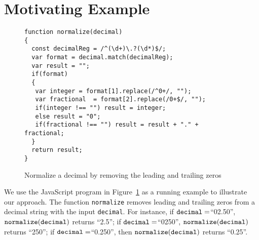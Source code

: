
\section{Motivating Example}\label{sec:mot}

\begin{figure}[htbp]
\begin{center}
\begin{verbatim}
function normalize(decimal)
{
  const decimalReg = /^(\d+)\.?(\d*)$/;
  var format = decimal.match(decimalReg);
  var result = "";
  if(format)
  {
   var integer = format[1].replace(/^0+/, "");
   var fractional  = format[2].replace(/0+$/, "");
   if(integer !== "") result = integer;
   else result = "0"; 
   if(fractional !== "") result = result + "." + fractional;
  }
  return result;
}
\end{verbatim}
\end{center}
\vspace{-8mm}
\caption{Normalize a decimal by removing the leading and trailing zeros}
\label{fig-run-exmp}
\end{figure}

We use the JavaScript program in Figure~\ref{fig-run-exmp} as a running example to illustrate our approach. The function {\tt normalize}   removes leading and trailing zeros from a decimal string with the input %
{\tt decimal}. For instance,  if $\tt{decimal} =$``02.50'', $\tt{normalize(decimal)}$ returns ``2.5''; if $\tt{decimal} =$``0250'', $\tt{normalize(decimal)}$ returns ``250''; if $\tt{decimal} =$``0.250'', then $\tt{normalize(decimal)}$ returns ``0.25''. 


